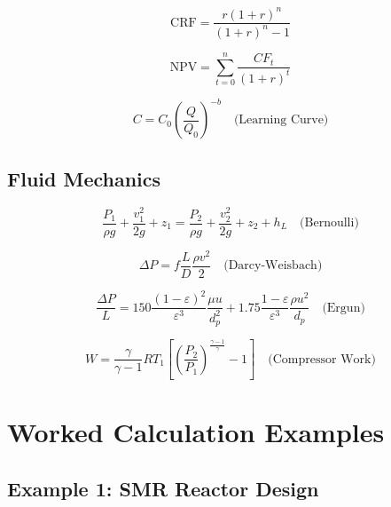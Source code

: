 \documentclass[12pt,twoside,openany]{book}
\begin{document}
\begin{dmath}
\boxed{\text{CRF} = \frac{r(1+r)^n}{(1+r)^n - 1}}
\end{dmath}

\begin{dmath}
\boxed{\text{NPV} = \sum_{t=0}^{n} \frac{CF_t}{(1+r)^t}}
\end{dmath}

\begin{dmath}
\boxed{C = C_0 \left(\frac{Q}{Q_0}\right)^{-b}} \quad \text{(Learning Curve)}
\end{dmath}

\section{Fluid Mechanics}

\begin{dmath}
\boxed{\frac{P_1}{\rho g} + \frac{v_1^2}{2g} + z_1
     = \frac{P_2}{\rho g} + \frac{v_2^2}{2g} + z_2 + h_L} \quad \text{(Bernoulli)}
\end{dmath}

\begin{dmath}
\boxed{\Delta P = f \frac{L}{D} \frac{\rho v^2}{2}} \quad \text{(Darcy-Weisbach)}
\end{dmath}

\begin{dmath}
\boxed{\frac{\Delta P}{L} = 150 \frac{(1-\varepsilon)^2}{\varepsilon^3}
       \frac{\mu u}{d_p^2}
       + 1.75 \frac{1-\varepsilon}{\varepsilon^3} \frac{\rho u^2}{d_p}}
       \quad \text{(Ergun)}
\end{dmath}

\begin{dmath}
\boxed{W = \frac{\gamma}{\gamma-1} RT_1
           \left[\left(\frac{P_2}{P_1}\right)^{\!\frac{\gamma-1}{\gamma}} - 1\right]}
           \quad \text{(Compressor Work)}
\end{dmath}


\chapter{Worked Calculation Examples}

\section{Example 1: SMR Reactor Design}
\end{document}
